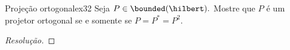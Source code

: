 \begin{exercício}{Projeção ortogonal}{ex32}
    Seja \(P \in \bounded(\hilbert).\) Mostre que \(P\) é um projetor ortogonal se e somente se \(P = P^* = P^2.\)
\end{exercício}
\begin{proof}[Resolução]

\end{proof}
